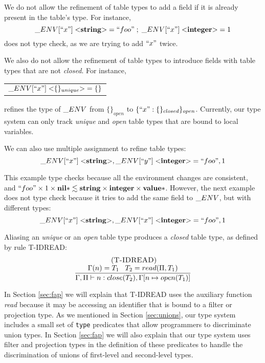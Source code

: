 We do not allow the refinement of table types to add a field if it is
already present in the table's type.
For instance,
\[
\string_ENV[``x"] \; {<}\String{>} = ``foo" \;;\; \string_ENV[``x"] \; {<}\Integer{>} = 1
\]
does not type check, as we are trying to add $``x"$ twice.

We also do not allow the refinement of table types to introduce
fields with table types that are not \emph{closed}.
For instance,
\begin{center}
\begin{tabular}{l}
$\string_ENV[``x"] \; {<}\{\}_{unique}{>} = \{\}$
\end{tabular}
\end{center}
refines the type of $\string_ENV$ from $\{\}_{open}$ to $\{``x":\{\}_{closed}\}_{open}$.
Currently, our type system can only track \emph{unique} and
\emph{open} table types that are bound to local variables.

We can also use multiple assignment to refine table types:
\[
\string_ENV[``x"] \; {<}\String{>}, \string_ENV[``y"] \; {<}\Integer{>} = ``foo", 1
\]

This example type checks because all the environment changes are consistent, and
$``foo" \times 1 \times \mathbf{nil}{*} \lesssim \mathbf{string} \times \mathbf{integer} \times \mathbf{value}{*}$.
However, the next example does not type check because it tries to add
the same field to $\string_ENV$, but with different types:
\[
\string_ENV[``x"] \; {<}\String{>}, \string_ENV[``x"] \; {<}\Integer{>} = ``foo", 1
\]

Aliasing an \emph{unique} or an \emph{open} table type produces a
\emph{closed} table type, as defined by rule \textsc{T-IDREAD}:
\[
\begin{array}{c}
\; (\textsc{T-IDREAD})\\
\dfrac{\Gamma(n) = T_{1} \;\;\; T_{2} = read(\Pi, T_{1})}
      {\Gamma, \Pi \vdash n:close(T_{2}), \Gamma[n \mapsto open(T_{1})]}
\end{array}
\]

In Section \ref{sec:fap} we will explain that \textsc{T-IDREAD} uses
the auxiliary function \emph{read} because it may be accessing an
identifier that is bound to a filter or projection type.
As we mentioned in Section \ref{sec:unions}, our type system includes
a small set of \texttt{type} predicates that allow programmers to
discriminate union types.
In Section \ref{sec:fap} we will also explain that our type system
uses filter and projection types in the definition of these predicates
to handle the discrimination of unions of first-level and second-level
types.

